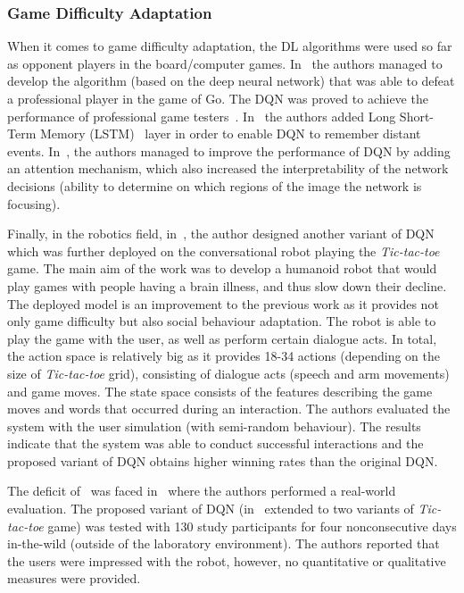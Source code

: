 \documentclass[thesis]{mas_proposal}
\begin{document}
\subsubsection{Game Difficulty Adaptation}
When it comes to game difficulty adaptation, the DL algorithms were used so far as opponent players in the board/computer games. In~\cite{Silver2016} the authors managed to develop the algorithm (based on the deep neural network) that was able to defeat a professional player in the game of Go. The DQN was proved to achieve the performance of professional game testers~\cite{mnih2015human}. In~\cite{hausknecht2015deep} the authors added Long Short-Term Memory (LSTM)~\cite{hochreiter1997long} layer in order to enable DQN to remember distant events. In~\cite{sorokin2015deep}, the authors managed to improve the performance of DQN by adding an attention mechanism, which also increased the interpretability of the network decisions (ability to determine on which regions of the image the network is focusing). 

Finally, in the robotics field, in~\cite{Cuayahuitl2017}, the author designed another variant of DQN which was further deployed on the conversational robot playing the \emph{Tic-tac-toe} game. The main aim of the work was to develop a humanoid robot that would play games with people having a brain illness, and thus slow down their decline. The deployed model is an improvement to the previous work as it provides not only game difficulty but also social behaviour adaptation. The robot is able to play the game with the user, as well as perform certain dialogue acts. In total, the action space is relatively big as it provides 18-34 actions (depending on the size of \emph{Tic-tac-toe} grid), consisting of dialogue acts (speech and arm movements) and game moves. The state space consists of the features describing the game moves and words that occurred during an interaction. The authors evaluated the system with the user simulation (with semi-random behaviour). The results indicate that the system was able to conduct successful interactions and the proposed variant of DQN obtains higher winning rates than the original DQN.

The deficit of~\cite{Cuayahuitl2017} was faced in~\cite{Cuayahuitl2020} where the authors performed a real-world evaluation. The proposed variant of DQN (in~\cite{Cuayahuitl2020} extended to two variants of \emph{Tic-tac-toe} game) was tested with 130 study participants for four nonconsecutive days in-the-wild (outside of the laboratory environment). The authors reported that the users were impressed with the robot, however, no quantitative or qualitative measures were provided.
\end{document}
